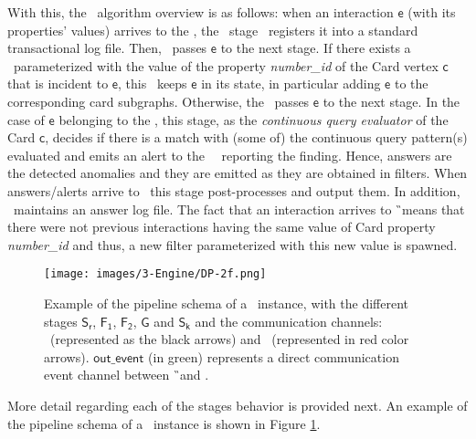 With this, the \DPATM\ algorithm overview is as follows: when an interaction $\mathsf{e}$ (with its properties' values) arrives to the \DPATM, the \source\ stage \Sr\ registers it into a standard transactional log file. Then, \Sr\ passes $\mathsf{e}$ to the next stage. If there exists a \filter\ parameterized with the value of the property \emph{number\_id} of the Card vertex $\mathsf{c}$ that is incident to $\mathsf{e}$, this \filter\ keeps $\mathsf{e}$ in its state, in particular adding $\mathsf{e}$ to the corresponding card subgraphs. Otherwise, the \filter\ passes $\mathsf{e}$ to the next stage. In the case of  $\mathsf{e}$ belonging to the \filter, this stage, as the \textit{continuous query evaluator} of the Card $\mathsf{c}$, decides if there is a match with (some of) the continuous query pattern(s) evaluated and emits an alert to the \sink\ \Sk\ reporting the finding. Hence, answers are the detected anomalies and they are emitted as they are obtained in filters. When answers/alerts arrive to \Sk\, this stage post-processes and output them. In addition, \Sk\ maintains an answer log file. The fact that an interaction arrives to \G\ means that there were not previous interactions having the same value of Card property \emph{number\_id} and thus, a new filter parameterized with this new value is spawned.\\

\begin{figure}[H]
    \centering
    \hspace*{-1cm}
    \texttt{[image: images/3-Engine/DP-2f.png]}
    \caption{Example of the pipeline schema of a \DPATM\ instance, with the different stages $\mathsf{S_r}$, $\mathsf{F_1}$, $\mathsf{F_2}$, $\mathsf{G}$ and $\mathsf{S_k}$ and the communication channels: \eventch\ (represented as the black arrows) and \alertch\ (represented in red color arrows). $\mathsf{out\_event}$ (in green) represents a direct communication event channel between \G\ and \Sk.}
    \label{img:pipeline-schema}
\end{figure}

More detail regarding each of the stages behavior is provided next. An example of the pipeline schema of a \DPATM\ instance is shown in Figure \ref{img:pipeline-schema}.

